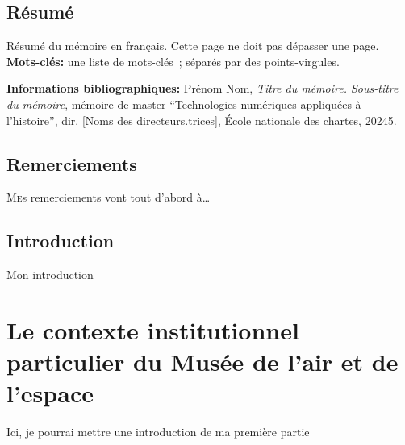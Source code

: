 \documentclass[12pt,twoside]{book}
\begin{document}
	\chapter{Résumé}
\medskip
	Résumé du mémoire en français. Cette page ne doit pas dépasser une page.\\
	
	\textbf{Mots-clés:} une liste de mots-clés~; séparés par des points-virgules.
	
	\textbf{Informations bibliographiques:} Prénom Nom, \textit{Titre du mémoire. Sous-titre du mémoire}, mémoire de master \enquote{Technologies numériques appliquées à l'histoire}, dir. [Noms des directeurs.trices], École nationale des chartes, 20245.
	
		\newpage{\pagestyle{empty}\cleardoublepage}
	
	\chapter{Remerciements}
	
\lettrine{M}es remerciements vont tout d'abord à\dots
	\newpage{\pagestyle{empty}\cleardoublepage}
	
\printbibliography

	
\chapter{Introduction}	
Mon introduction 

\newpage{\pagestyle{empty}\cleardoublepage}

	\mainmatter

	

	\part{Le contexte institutionnel particulier du Musée de l'air et de l'espace}


Ici, je pourrai mettre une introduction de ma première partie

\end{document}
